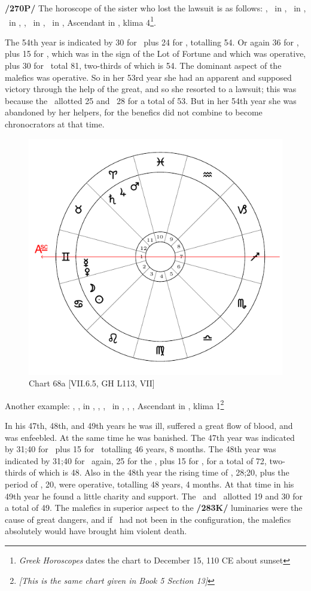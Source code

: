 \noindent\textbf{/270P/} The horoscope of the sister who lost the lawsuit is as follows: \Sun, \Mercury\, in \Sagittarius, \Moon\, in \Cancer, \Saturn\, in \Aquarius, \Jupiter, \Venus\, in \Capricorn, \Mars\, in \Scorpio, Ascendant in \Gemini, klima 4\footnote{\textit{Greek Horoscopes} dates the chart to December 15, 110 CE about sunset}.

The 54th year is indicated by 30 for \Saturn\, plus 24 for \Venus, totalling 54. Or again 36 for \Scorpio, plus 15 for \Mars, which was in the sign of the Lot of Fortune and which was operative, plus 30
for \Saturn\, total 81, two-thirds of which is 54. The dominant aspect of the malefics was operative. So in her 53rd year she had an apparent and supposed victory through the help of the great, and so she resorted to a lawsuit; this was because the \Moon\, allotted 25 and \Capricorn\, 28 for a total of 53. But in her 54th year
she was abandoned by her helpers, for the benefics did not combine to become chronocrators at that time.

\newpage
\begin{figure}
\centering
\vspace{0pt}
\includegraphics[width=.68\textwidth]{charts/5_10_13}
\caption{Chart 68a [VII.6.5, GH L113, VII]}
\label{fig:chart68a}
\end{figure} 

\noindent Another example: \Sun, \Moon, in \Cancer, \Saturn, \Jupiter, \Mars\, in \Aries, \Venus, \Mercury, Ascendant in \Gemini, klima 1\footnote{\textit{[This is the same chart given in Book 5 Section 13]}}

In his 47th, 48th, and 49th years he was ill, suffered a great flow of blood, and was enfeebled. At the same time he was banished. The 47th year was indicated by 31;40 for \Cancer\, plus 15 for
\Mars\, totalling 46 years, 8 months. The 48th year was indicated by 31;40 for \Cancer\, again, 25 for the \Moon, plus 15 for \Mars, for a total of 72, two-thirds of which is 48. Also in the 48th year the rising time of \Gemini, 28;20, plus the period of \Mercury, 20, were operative, totalling 48 years, 4 months. At that time in his 49th year he found a little charity and support. The \Sun\, and \Saturn\, allotted 19 and 30 for a total of 49. The malefics in superior aspect to the \textbf{/283K/} luminaries were the cause of great dangers, and if \Jupiter\, had not been in the configuration, the malefics absolutely would have brought him violent death. 

